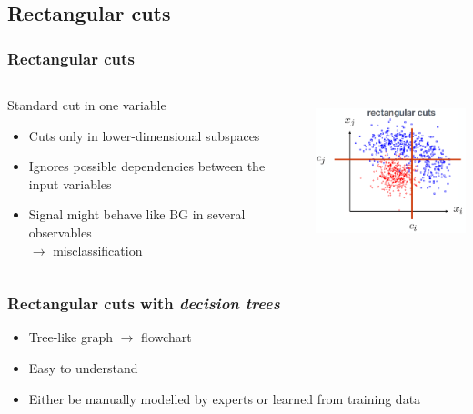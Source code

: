 \documentclass{beamer}
\begin{document}
\subsection{Rectangular cuts} %
\begin{frame}
    \frametitle{Rectangular cuts}
    \begin{columns}[T] %
        \begin{column}{.48\textwidth}
            \vspace*{-10mm}
            Standard cut in one variable
            \begin{itemize}
                \item<1-> Cuts only in lower-dimensional subspaces
                \item<2-> Ignores possible dependencies between the input variables
                \item<3-> Signal might behave like BG in several observables\\ $\to$ misclassification
            \end{itemize}
        \end{column}%
        \hfill%
        \begin{column}{.48\textwidth}
            \vspace*{-10mm}
            \raggedright\includegraphics[height=4.3cm,keepaspectratio]{pics/mva_cuts_rectangular.png}%
            
        \end{column}%
    \end{columns}

\end{frame}


\begin{frame}
    \frametitle{Rectangular cuts with \emph{decision trees}}
    \vspace*{-7mm}
    \begin{itemize}
        \item Tree-like graph $\to$ flowchart
        \item Easy to understand
        \item Either be manually modelled by experts or learned from training data
    \end{itemize}
\end{frame}
\end{document}
